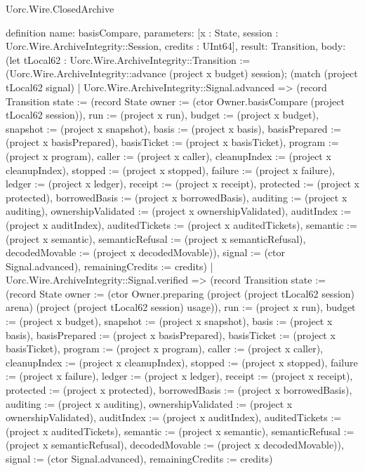 \begin{lexlean}{Uorc.Wire.ClosedArchive}
\begin{semanticmodule}
definition{
  name: basisCompare,
  parameters: [x : State, session : Uorc.Wire.ArchiveIntegrity::Session, credits : UInt64],
  result: Transition,
  body: (let tLocal62 : Uorc.Wire.ArchiveIntegrity::Transition := (Uorc.Wire.ArchiveIntegrity::advance (project x budget) session); (match (project tLocal62 signal)
    | Uorc.Wire.ArchiveIntegrity::Signal.advanced => (record Transition {state := (record State {owner := (ctor Owner.basisCompare (project tLocal62 session)), run := (project x run), budget := (project x budget), snapshot := (project x snapshot), basis := (project x basis), basisPrepared := (project x basisPrepared), basisTicket := (project x basisTicket), program := (project x program), caller := (project x caller), cleanupIndex := (project x cleanupIndex), stopped := (project x stopped), failure := (project x failure), ledger := (project x ledger), receipt := (project x receipt), protected := (project x protected), borrowedBasis := (project x borrowedBasis), auditing := (project x auditing), ownershipValidated := (project x ownershipValidated), auditIndex := (project x auditIndex), auditedTickets := (project x auditedTickets), semantic := (project x semantic), semanticRefusal := (project x semanticRefusal), decodedMovable := (project x decodedMovable)}), signal := (ctor Signal.advanced), remainingCredits := credits})
    | Uorc.Wire.ArchiveIntegrity::Signal.verified => (record Transition {state := (record State {owner := (ctor Owner.preparing (project (project tLocal62 session) arena) (project (project tLocal62 session) usage)), run := (project x run), budget := (project x budget), snapshot := (project x snapshot), basis := (project x basis), basisPrepared := (project x basisPrepared), basisTicket := (project x basisTicket), program := (project x program), caller := (project x caller), cleanupIndex := (project x cleanupIndex), stopped := (project x stopped), failure := (project x failure), ledger := (project x ledger), receipt := (project x receipt), protected := (project x protected), borrowedBasis := (project x borrowedBasis), auditing := (project x auditing), ownershipValidated := (project x ownershipValidated), auditIndex := (project x auditIndex), auditedTickets := (project x auditedTickets), semantic := (project x semantic), semanticRefusal := (project x semanticRefusal), decodedMovable := (project x decodedMovable)}), signal := (ctor Signal.advanced), remainingCredits := credits})
}
\end{semanticmodule}
\end{lexlean}
